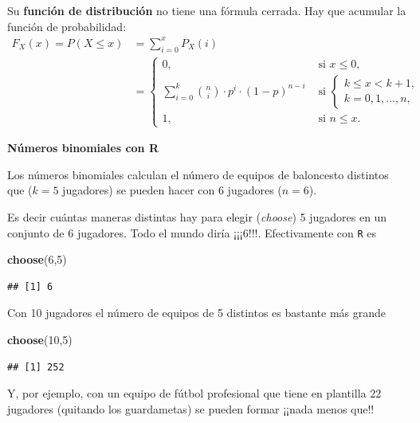 \documentclass[]{book}
\newenvironment{Shaded}{\begin{snugshade}}{\end{snugshade}}
\newcommand{\DecValTok}[1]{\textcolor[rgb]{0.00,0.00,0.81}{#1}}
\newcommand{\KeywordTok}[1]{\textcolor[rgb]{0.13,0.29,0.53}{\textbf{#1}}}
\newcommand{\NormalTok}[1]{#1}
\begin{document}
Su \textbf{función de distribución} no tiene una fórmula cerrada. Hay que acumular la función de probabilidad:
\[
\begin{array}{ll}
F_{X}(x)=P(X\leq x) & =  \sum_{i=0}^x P_X(i)\\
& = 
\left\{
\begin{array}{ll}
0, & \mbox{ si } x\leq 0,\\\displaystyle
\sum_{i=0}^k {n\choose i}\cdot  p^i \cdot (1-p)^{n-i} & \mbox{ si } 
\left\{
  \begin{array}{l} 
  k\leq x< k+1,\\
  k=0,1,\ldots,n,
  \end{array}
\right.\\
1, & \mbox{ si } n\leq x.
\end{array}
\right.
\end{array}
\]

\textbf{Números binomiales con R}

Los números binomiales calculan el número de equipos de baloncesto distintos que (\(k=5\) jugadores) se pueden hacer con 6 jugadores (\(n=6\)).

Es decir cuántas maneras distintas hay para elegir (\emph{choose}) 5 jugadores en un conjunto de 6 jugadores. Todo el mundo diría
¡¡¡6!!!. Efectivamente con \texttt{R} es

\begin{Shaded}
\begin{Highlighting}[]
\KeywordTok{choose}\NormalTok{(}\DecValTok{6}\NormalTok{,}\DecValTok{5}\NormalTok{)}
\end{Highlighting}
\end{Shaded}

\begin{verbatim}
## [1] 6
\end{verbatim}

Con 10 jugadores el número de equipos de 5 distintos es bastante más grande

\begin{Shaded}
\begin{Highlighting}[]
\KeywordTok{choose}\NormalTok{(}\DecValTok{10}\NormalTok{,}\DecValTok{5}\NormalTok{)}
\end{Highlighting}
\end{Shaded}

\begin{verbatim}
## [1] 252
\end{verbatim}

Y, por ejemplo, con un equipo de fútbol profesional que tiene en plantilla 22 jugadores (quitando los guardametas) se pueden formar ¡¡nada menos que!!
\end{document}
